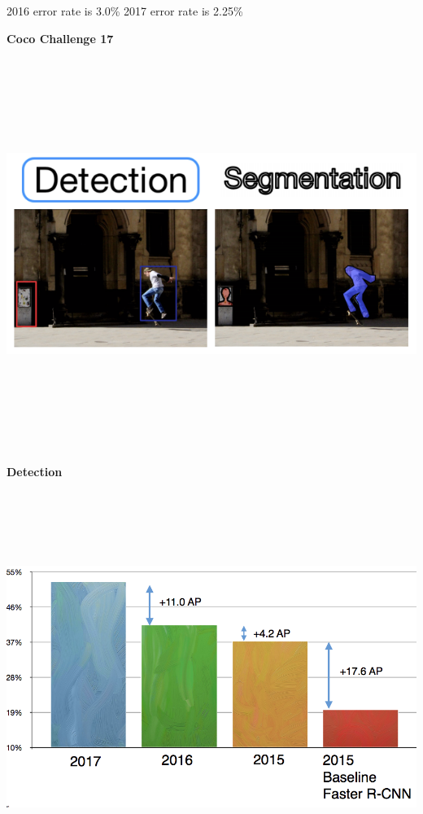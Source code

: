 \documentclass[landscape]{article}
\newcommand{\slide}[1]{\vfill
\eject
\centerline{\bf #1}
\vfill}
\begin{document}
{2016 error rate is 3.0\% \hspace{1.0in} 2017 error rate is 2.25\%

\slide{Coco Challenge 17}

\centerline{\includegraphics[height=5.0in]{../images/Coco17a}}


\slide{Detection}

\centerline{\includegraphics[height=5.0in]{../images/Coco17b}}


}
\end{document}
